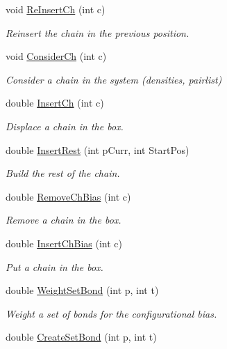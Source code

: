 \begin{DoxyCompactItemize}
void \hyperlink{classForces_aaea07c5c698924ba7efc75988997086c}{\-Re\-Insert\-Ch} (int c)
\begin{DoxyCompactList}\small\item\em \-Reinsert the chain in the previous position. \end{DoxyCompactList}\item 
void \hyperlink{classForces_a1c4bc6d5b46ce58c1e6139e9feccea5a}{\-Consider\-Ch} (int c)
\begin{DoxyCompactList}\small\item\em \-Consider a chain in the system (densities, pairlist) \end{DoxyCompactList}\item 
double \hyperlink{classForces_aed7689c1abd36c6ac8743fadd2e6cbdf}{\-Insert\-Ch} (int c)
\begin{DoxyCompactList}\small\item\em \-Displace a chain in the box. \end{DoxyCompactList}\item 
double \hyperlink{classForces_a8e9fda810a12eeaba2c7b72af5a1e664}{\-Insert\-Rest} (int p\-Curr, int \-Start\-Pos)
\begin{DoxyCompactList}\small\item\em \-Build the rest of the chain. \end{DoxyCompactList}\item 
double \hyperlink{classForces_aae7e57b54965ad985ab041a040dfc93d}{\-Remove\-Ch\-Bias} (int c)
\begin{DoxyCompactList}\small\item\em \-Remove a chain in the box. \end{DoxyCompactList}\item 
double \hyperlink{classForces_a766511ed1b66a8b4ef97b1b343fb6254}{\-Insert\-Ch\-Bias} (int c)
\begin{DoxyCompactList}\small\item\em \-Put a chain in the box. \end{DoxyCompactList}\item 
double \hyperlink{classForces_a97d31164f5b192ff0e68d26f120e9e78}{\-Weight\-Set\-Bond} (int p, int t)
\begin{DoxyCompactList}\small\item\em \-Weight a set of bonds for the configurational bias. \end{DoxyCompactList}\item 
double \hyperlink{classForces_ac80c2d5ad9a6b3f4de84f825844d1a36}{\-Create\-Set\-Bond} (int p, int t)

\end{DoxyCompactItemize}
